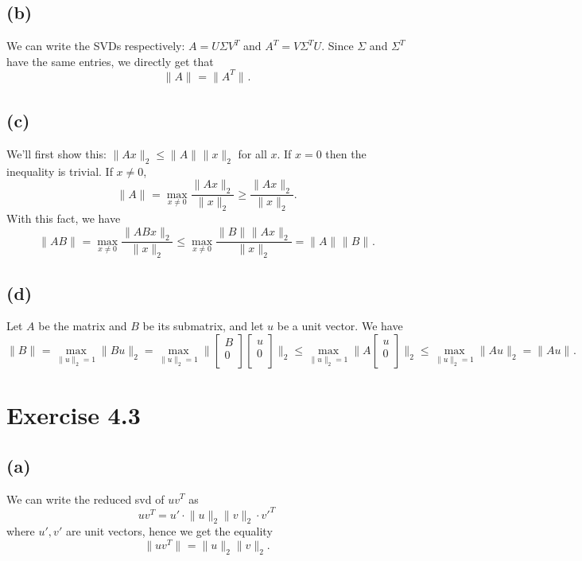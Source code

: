 \subsection*{(b)}
We can write the SVDs respectively: $A = U \Sigma V^T$ and $A^T = V \Sigma^T U$. Since $\Sigma$ and $\Sigma^T$ 
have the same entries, we directly get that 
\[ \lVert A \rVert_{} = \lVert A^T \rVert_{}. \]

\subsection*{(c)}
We'll first show this: $\lVert Ax \rVert_{2} \leq \lVert A \rVert_{}\lVert x \rVert_{2}$ for all $x$. If $x = 0$ 
then the inequality is trivial. If $x \neq 0$, 
\[ \lVert A \rVert_{} = \max_{x \neq 0} \frac{\lVert Ax \rVert_{2}}{\lVert x \rVert_{2}} \geq 
\frac{\lVert Ax \rVert_{2}}{\lVert x \rVert_{2}}. \]
With this fact, we have 
\[ \lVert AB \rVert_{} = \max_{x \neq 0} \frac{\lVert ABx \rVert_{2}}{\lVert x \rVert_{2}} 
\leq \max_{x \neq 0} \frac{\lVert B \rVert_{}\lVert Ax \rVert_{2}}{\lVert x \rVert_{2}} 
= \lVert A \rVert_{} \lVert B \rVert_{}. \]

\subsection*{(d)}
Let $A$ be the matrix and $B$ be its submatrix, and let $u$ be a unit vector. We have 
\[ \lVert B \rVert_{} = \max_{\lVert u \rVert_{2} = 1} \lVert Bu \rVert_{2} = 
\max_{\lVert u \rVert_{2} = 1} \lVert \begin{bmatrix}
B \\
0 \\
\end{bmatrix} \begin{bmatrix}
u \\
0 \\
\end{bmatrix} \rVert_{2} 
\leq \max_{\lVert u \rVert_{2} = 1} \lVert A \begin{bmatrix}
u \\
0 \\
\end{bmatrix} \rVert_{2} \leq \max_{\lVert u \rVert_{2} = 1} \lVert Au \rVert_{2} = \lVert Au \rVert_{}. \]


\newpage
\section*{Exercise 4.3}
\subsection*{(a)}
We can write the reduced svd of $uv^T$ as 
\[ uv^T = u' \cdot \lVert u \rVert_{2}\lVert v \rVert_{2} \cdot v'^T \]
where $u', v'$ are unit vectors, hence we get the equality 
\[ \lVert uv^T \rVert_{} = \lVert u \rVert_{2}\lVert v \rVert_{2}. \]

